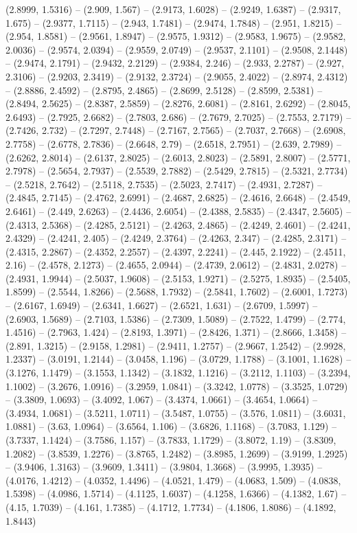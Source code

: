 (2.8999, 1.5316) -- (2.909, 1.567) -- (2.9173, 1.6028) -- (2.9249, 1.6387) -- (2.9317, 1.675) -- (2.9377, 1.7115) -- (2.943, 1.7481) -- (2.9474, 1.7848) -- (2.951, 1.8215) -- (2.954, 1.8581) -- (2.9561, 1.8947) -- (2.9575, 1.9312) -- (2.9583, 1.9675) -- (2.9582, 2.0036) -- (2.9574, 2.0394) -- (2.9559, 2.0749) -- (2.9537, 2.1101) -- (2.9508, 2.1448) -- (2.9474, 2.1791) -- (2.9432, 2.2129) -- (2.9384, 2.246) -- (2.933, 2.2787) -- (2.927, 2.3106) -- (2.9203, 2.3419) -- (2.9132, 2.3724) -- (2.9055, 2.4022) -- (2.8974, 2.4312) -- (2.8886, 2.4592) -- (2.8795, 2.4865) -- (2.8699, 2.5128) -- (2.8599, 2.5381) -- (2.8494, 2.5625) -- (2.8387, 2.5859) -- (2.8276, 2.6081) -- (2.8161, 2.6292) -- (2.8045, 2.6493) -- (2.7925, 2.6682) -- (2.7803, 2.686) -- (2.7679, 2.7025) -- (2.7553, 2.7179) -- (2.7426, 2.732) -- (2.7297, 2.7448) -- (2.7167, 2.7565) -- (2.7037, 2.7668) -- (2.6908, 2.7758) -- (2.6778, 2.7836) -- (2.6648, 2.79) -- (2.6518, 2.7951) -- (2.639, 2.7989) -- (2.6262, 2.8014) -- (2.6137, 2.8025) -- (2.6013, 2.8023) -- (2.5891, 2.8007) -- (2.5771, 2.7978) -- (2.5654, 2.7937) -- (2.5539, 2.7882) -- (2.5429, 2.7815) -- (2.5321, 2.7734) -- (2.5218, 2.7642) -- (2.5118, 2.7535) -- (2.5023, 2.7417) -- (2.4931, 2.7287) -- (2.4845, 2.7145) -- (2.4762, 2.6991) -- (2.4687, 2.6825) -- (2.4616, 2.6648) -- (2.4549, 2.6461) -- (2.449, 2.6263) -- (2.4436, 2.6054) -- (2.4388, 2.5835) -- (2.4347, 2.5605) -- (2.4313, 2.5368) -- (2.4285, 2.5121) -- (2.4263, 2.4865) -- (2.4249, 2.4601) -- (2.4241, 2.4329) -- (2.4241, 2.405) -- (2.4249, 2.3764) -- (2.4263, 2.347) -- (2.4285, 2.3171) -- (2.4315, 2.2867) -- (2.4352, 2.2557) -- (2.4397, 2.2241) -- (2.445, 2.1922) -- (2.4511, 2.16) -- (2.4578, 2.1273) -- (2.4655, 2.0944) -- (2.4739, 2.0612) -- (2.4831, 2.0278) -- (2.4931, 1.9944) -- (2.5037, 1.9608) -- (2.5153, 1.9271) -- (2.5275, 1.8935) -- (2.5405, 1.8599) -- (2.5544, 1.8266) -- (2.5688, 1.7932) -- (2.5841, 1.7602) -- (2.6001, 1.7273) -- (2.6167, 1.6949) -- (2.6341, 1.6627) -- (2.6521, 1.631) -- (2.6709, 1.5997) -- (2.6903, 1.5689) -- (2.7103, 1.5386) -- (2.7309, 1.5089) -- (2.7522, 1.4799) -- (2.774, 1.4516) -- (2.7963, 1.424) -- (2.8193, 1.3971) -- (2.8426, 1.371) -- (2.8666, 1.3458) -- (2.891, 1.3215) -- (2.9158, 1.2981) -- (2.9411, 1.2757) -- (2.9667, 1.2542) -- (2.9928, 1.2337) -- (3.0191, 1.2144) -- (3.0458, 1.196) -- (3.0729, 1.1788) -- (3.1001, 1.1628) -- (3.1276, 1.1479) -- (3.1553, 1.1342) -- (3.1832, 1.1216) -- (3.2112, 1.1103) -- (3.2394, 1.1002) -- (3.2676, 1.0916) -- (3.2959, 1.0841) -- (3.3242, 1.0778) -- (3.3525, 1.0729) -- (3.3809, 1.0693) -- (3.4092, 1.067) -- (3.4374, 1.0661) -- (3.4654, 1.0664) -- (3.4934, 1.0681) -- (3.5211, 1.0711) -- (3.5487, 1.0755) -- (3.576, 1.0811) -- (3.6031, 1.0881) -- (3.63, 1.0964) -- (3.6564, 1.106) -- (3.6826, 1.1168) -- (3.7083, 1.129) -- (3.7337, 1.1424) -- (3.7586, 1.157) -- (3.7833, 1.1729) -- (3.8072, 1.19) -- (3.8309, 1.2082) -- (3.8539, 1.2276) -- (3.8765, 1.2482) -- (3.8985, 1.2699) -- (3.9199, 1.2925) -- (3.9406, 1.3163) -- (3.9609, 1.3411) -- (3.9804, 1.3668) -- (3.9995, 1.3935) -- (4.0176, 1.4212) -- (4.0352, 1.4496) -- (4.0521, 1.479) -- (4.0683, 1.509) -- (4.0838, 1.5398) -- (4.0986, 1.5714) -- (4.1125, 1.6037) -- (4.1258, 1.6366) -- (4.1382, 1.67) -- (4.15, 1.7039) -- (4.161, 1.7385) -- (4.1712, 1.7734) -- (4.1806, 1.8086) -- (4.1892, 1.8443) 